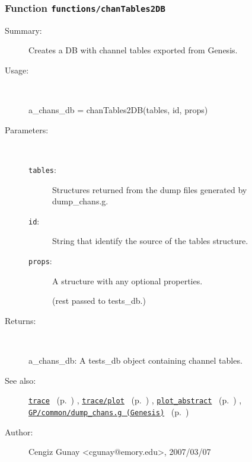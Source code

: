 \subsubsection[Function \texttt{chanTables2DB}]{Function \texttt{functions/chanTables2DB}}%
%
\label{ref_functions__chanTables2DB}%
\hypertarget{ref_functions__chanTables2DB}{}%
\begin{description}
\item[Summary:]Creates a DB with channel tables exported from Genesis.
%
\item[Usage:]~%
\begin{lyxcode}%
a\_chans\_db = chanTables2DB(tables, id, props)
%
\end{lyxcode}%
%
%
\item[Parameters:]~
\begin{description}%
\item[\texttt{tables}:]
 Structures returned from the dump files generated by dump\_chans.g.
\item[\texttt{id}:]
 String that identify the source of the tables structure.
\item[\texttt{props}:]
 A structure with any optional properties.

(rest passed to tests\_db.)\end{description}%
%
\item[Returns:]~

	a\_chans\_db: A tests\_db object containing channel tables.
%
%
\item[See also:]%
\hyperlink{ref_trace}{\texttt{trace}}%
\ (p.~\pageref{ref_trace})%
%
, \hyperlink{ref_trace__plot}{\texttt{trace/plot}}%
\ (p.~\pageref{ref_trace__plot})%
%
, \hyperlink{ref_plot_abstract}{\texttt{plot\_abstract}}%
\ (p.~\pageref{ref_plot_abstract})%
%
, \hyperlink{ref_GP__common}{\texttt{GP/common/dump\_chans.g (Genesis)}}%
\ (p.~\pageref{ref_GP__common})%
%
%
\item[Author:]%
Cengiz Gunay <cgunay@emory.edu>, 2007/03/07%
\end{description}
\methodline%
